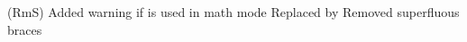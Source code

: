      {(RmS) Added warning if  is used in math mode}
     {Replaced  by }
     {Removed superfluous braces}
 \begin{macro}{\item}
    \begin{teX}
\def\item{%
  \@inmatherr\item
  \@ifnextchar [\@item{\@noitemargtrue \@item[\@itemlabel]}}
    \end{teX}
 \end{macro}
 \begin{macro}{\@donoparitem}
    \begin{teX}
\def\@donoparitem{%
  \@noparitemfalse
  \global\setbox\@labels\hbox{\hskip -\leftmargin
                               \unhbox\@labels
                                \hskip \leftmargin}%
  \if@minipage\else
    \@tempskipa\lastskip
    \vskip -\lastskip
    \advance\@tempskipa\@outerparskip
    \advance\@tempskipa -\parskip
    \vskip\@tempskipa
  \fi}
    \end{teX}
 \end{macro}

